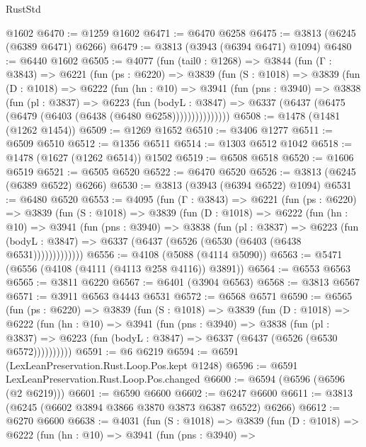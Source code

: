 \begin{lexlean}{RustStd}
\begin{coremodule}
{\begin{coremodule}
{{{{{{{{{{{{{{{{{{{{{{{{{{{{{{{{{{{    @1602
@6470 := @1259 @1602
@6471 := @6470 @6258
@6475 := @3813 (@6245 (@6389 @6471) @6266)
@6479 := @3813 (@3943 (@6394 @6471) @1094)
@6480 := @6440 @1602
@6505 := @4077
    (fun (tail0 : @1268) =>
    @3844
      (fun (Γ : @3843) =>
      @6221
        (fun (ps : @6220) =>
        @3839
          (fun (S : @1018) =>
          @3839
            (fun (D : @1018) =>
            @6222
              (fun (hn : @10) =>
              @3941
                (fun (pns : @3940) =>
                @3838
                  (fun (pl : @3837) =>
                  @6223
                    (fun (bodyL : @3847) =>
                    @6337 (@6437 (@6475 (@6479 (@6403 (@6438 (@6480 @6258)))))))))))))))
@6508 := @1478 (@1481 (@1262 @1454))
@6509 := @1269 @1652
@6510 := @3406 @1277
@6511 := @6509 @6510
@6512 := @1356 @6511
@6514 := @1303 @6512 @1042
@6518 := @1478 (@1627 (@1262 @6514)) @1502
@6519 := @6508 @6518
@6520 := @1606 @6519
@6521 := @6505 @6520
@6522 := @6470 @6520
@6526 := @3813 (@6245 (@6389 @6522) @6266)
@6530 := @3813 (@3943 (@6394 @6522) @1094)
@6531 := @6480 @6520
@6553 := @4095
    (fun (Γ : @3843) =>
    @6221
      (fun (ps : @6220) =>
      @3839
        (fun (S : @1018) =>
        @3839
          (fun (D : @1018) =>
          @6222
            (fun (hn : @10) =>
            @3941
              (fun (pns : @3940) =>
              @3838
                (fun (pl : @3837) =>
                @6223
                  (fun (bodyL : @3847) =>
                  @6337 (@6437 (@6526 (@6530 (@6403 (@6438 @6531)))))))))))))
@6556 := @4108 (@5088 (@4114 @5090))
@6563 := @5471 (@6556 (@4108 (@4111 (@4113 @258 @4116)) @3891))
@6564 := @6553 @6563
@6565 := @3811 @6220
@6567 := @6401 (@3904 @6563)
@6568 := @3813 @6567
@6571 := @3911 @6563 @4443 @6531
@6572 := @6568 @6571
@6590 := @6565
    (fun (ps : @6220) =>
    @3839
      (fun (S : @1018) =>
      @3839
        (fun (D : @1018) =>
        @6222
          (fun (hn : @10) =>
          @3941
            (fun (pns : @3940) =>
            @3838
              (fun (pl : @3837) =>
              @6223 (fun (bodyL : @3847) => @6337 (@6437 (@6526 (@6530 @6572))))))))))
@6591 := @6 @6219
@6594 := @6591 (LexLeanPreservation.Rust.Loop.Pos.kept @1248)
@6596 := @6591 LexLeanPreservation.Rust.Loop.Pos.changed
@6600 := @6594 (@6596 (@6596 (@2 @6219)))
@6601 := @6590 @6600
@6602 := @6247 @6600
@6611 := @3813 (@6245 (@6602 @3894 @3866 @3870 @3873 @6387 @6522) @6266)
@6612 := @6270 @6600
@6638 := @4031
    (fun (S : @1018) =>
    @3839
      (fun (D : @1018) =>
      @6222
        (fun (hn : @10) =>
        @3941
          (fun (pns : @3940) =>
}}}}}}}}}}}}}}}}}}}}}}}}}}}}}}}}}}}
\end{coremodule}}
\end{coremodule}
\end{lexlean}
